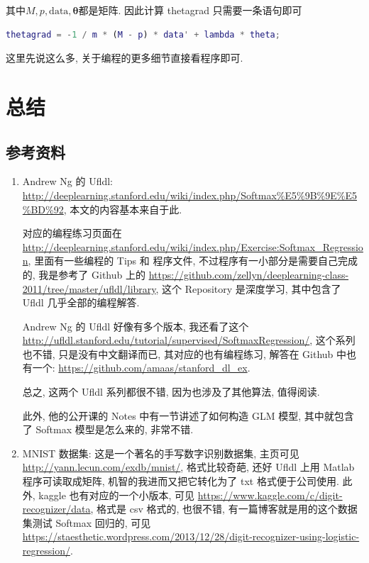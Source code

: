 \documentclass[a4paper,UTF8]{ctexart}
\theoremstyle{plain} \newtheorem{theorem}{定理}[section]
\theoremstyle{plain} \newtheorem{definition}{定义}[section]
\theoremstyle{plain} \newtheorem{lemma}{引理}[section]
\theoremstyle{plain} \newtheorem{proposition}{命题}[section]
\theoremstyle{plain} \newtheorem{example}{例}[section]
\theoremstyle{plain} \newtheorem{remark}{注}[section]
\theoremstyle{plain} \newtheorem{corollary}{推论}[section]
\begin{document}
其中$M, p, \mathrm{data}, \bm{\theta}$都是矩阵. 因此计算 thetagrad 只需要一条语句即可
\begin{lstlisting}[language = matlab]
thetagrad = -1 / m * (M - p) * data' + lambda * theta;
\end{lstlisting}

这里先说这么多, 关于编程的更多细节直接看程序即可.



\section{总结}

\subsection{参考资料}
\begin{enumerate}[(1)]
\item Andrew Ng 的 Ufldl: \url{http://deeplearning.stanford.edu/wiki/index.php/Softmax%E5%9B%9E%E5%BD%92}, 本文的内容基本来自于此.

对应的编程练习页面在 \url{http://deeplearning.stanford.edu/wiki/index.php/Exercise:Softmax_Regression}, 里面有一些编程的 Tips 和 程序文件, 不过程序有一小部分是需要自己完成的, 我是参考了 Github 上的 \url{https://github.com/zellyn/deeplearning-class-2011/tree/master/ufldl/library}, 这个 Repository 是深度学习, 其中包含了 Ufldl 几乎全部的编程解答.

Andrew Ng 的 Ufldl 好像有多个版本, 我还看了这个 \url{http://ufldl.stanford.edu/tutorial/supervised/SoftmaxRegression/}, 这个系列也不错, 只是没有中文翻译而已, 其对应的也有编程练习, 解答在 Github 中也有一个: \url{https://github.com/amaas/stanford_dl_ex}.

总之, 这两个 Ufldl 系列都很不错, 因为也涉及了其他算法, 值得阅读.

此外, 他的公开课的 Notes 中有一节讲述了如何构造 GLM 模型, 其中就包含了 Softmax 模型是怎么来的, 非常不错.

\item MNIST 数据集: 这是一个著名的手写数字识别数据集, 主页可见 \url{http://yann.lecun.com/exdb/mnist/}, 格式比较奇葩, 还好 Ufldl 上用 Matlab 程序可读取成矩阵, 机智的我进而又把它转化为了 txt 格式便于公司使用. 此外, kaggle 也有对应的一个小版本, 可见 \url{https://www.kaggle.com/c/digit-recognizer/data}, 格式是 csv 格式的, 也很不错, 有一篇博客就是用的这个数据集测试 Softmax 回归的, 可见 \url{https://staesthetic.wordpress.com/2013/12/28/digit-recognizer-using-logistic-regression/}.


\end{enumerate}
\end{document}
